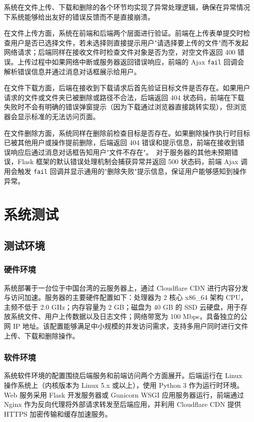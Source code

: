 \documentclass[UTF8,zihao=-4]{ctexrep}
\begin{document}
系统在文件上传、下载和删除的各个环节均实现了异常处理逻辑，确保在异常情况下系统能够给出友好的错误反馈而不是直接崩溃。

在文件上传方面，系统在前端和后端两个层面进行验证。前端在上传表单提交时检查用户是否已选择文件，若未选择则直接提示用户"请选择要上传的文件"而不发起网络请求；后端同样在接收文件时检查文件对象是否为空，对空文件返回 400 错误。上传过程中如果网络中断或服务器返回错误响应，前端的 Ajax \texttt{fail} 回调会解析错误信息并通过消息对话框展示给用户。

在文件下载方面，后端在接收到下载请求后首先验证目标文件是否存在。如果用户请求的文件或文件夹已被删除或路径不合法，后端返回 404 状态码，前端在下载失败时不会有明确的错误弹窗提示（因为下载通过浏览器直接跳转实现），但浏览器会显示标准的无法访问页面。

在文件删除方面，系统同样在删除前检查目标是否存在。如果删除操作执行时目标已被其他用户或操作提前删除，后端返回 404 错误和提示信息，前端在接收到错误响应后通过消息对话框告知用户"文件不存在"。\
对于服务器的其他未预期错误，Flask 框架的默认错误处理机制会捕获异常并返回 500 状态码，前端 Ajax 调用会触发 \texttt{fail} 回调并显示通用的"删除失败"提示信息，保证用户能够感知到操作异常。


\chapter{系统测试}

\section{测试环境}

\subsection{硬件环境}

系统部署于一台位于中国台湾的云服务器上，通过 Cloudflare CDN 进行内容分发与访问加速。服务器的主要硬件配置如下：处理器为 2 核心 x86\_64 架构 CPU，主频不低于 2.0 GHz；内存容量为 2 GB；磁盘为 40 GB 的 SSD 云硬盘，用于存放系统文件、用户上传数据以及日志文件；网络带宽为 100 Mbps，具备独立的公网 IP 地址。该配置能够满足中小规模的并发访问需求，支持多用户同时进行文件上传、下载和删除操作。

\subsection{软件环境}

系统软件环境的配置围绕后端服务和前端访问两个方面展开。后端运行在 Linux 操作系统上（内核版本为 Linux 5.x 或以上），使用 Python 3 作为运行时环境。Web 服务采用 Flask 开发服务器或 Gunicorn WSGI 应用服务器运行，前端通过 Nginx 作为反向代理将外部请求转发至后端应用，并利用 Cloudflare CDN 提供 HTTPS 加密传输和缓存加速服务。
\end{document}
